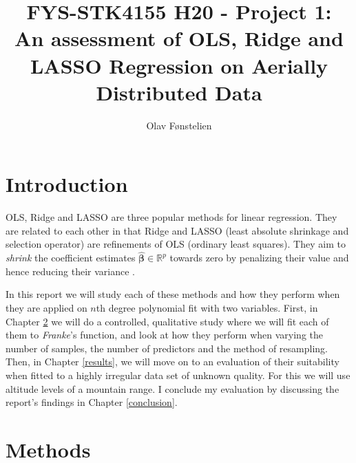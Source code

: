 \documentclass[]{article}
\title{FYS-STK4155 H20 - Project 1:\\An assessment of OLS, Ridge and LASSO Regression on Aerially Distributed Data}
\author{Olav Fønstelien}
\begin{document}
\maketitle

\begin{abstract}


\end{abstract}

\section{Introduction} \label{intro}
OLS, Ridge and LASSO are three popular methods for linear regression. They are related to each other in that Ridge and LASSO (least absolute shrinkage and selection operator) are refinements of OLS (ordinary least squares). They aim to \textit{shrink} the coefficient estimates $\mathbf{\hat{\beta}} \in \mathbb{R}^p$ towards zero by penalizing their value and hence reducing their variance \cite{james2013introduction}.

In this report we will study each of these methods and how they perform when they are applied on $n$th degree polynomial fit with two variables. First, in Chapter \ref{methods} we will do a controlled, qualitative study where we will fit each of them to \textit{Franke}'s function, and look at how they perform when varying the number of samples, the number of predictors and the method of resampling. Then, in Chapter \ref{results}, we will move on to an evaluation of their suitability when fitted to a highly irregular data set of unknown quality. For this we will use altitude levels of a mountain range. I conclude my evaluation by discussing the report's findings in Chapter \ref{conclusion}.

\section{Methods} \label{methods}
\end{document}
